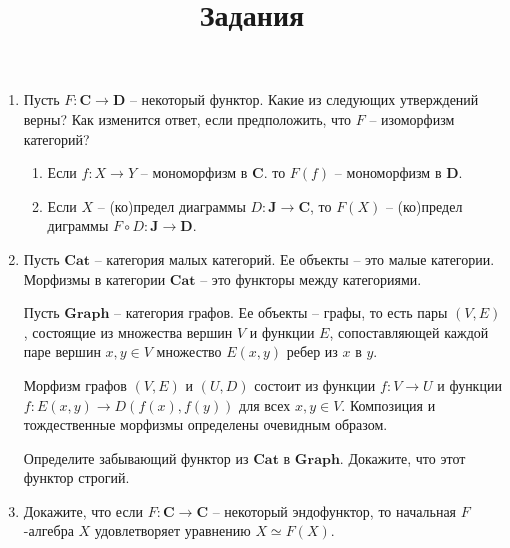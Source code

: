 \documentclass[draft]{article}
\newcommand{\cat}[1]{\mathbf{#1}}
\renewcommand{\C}{\cat{C}}
\newcommand{\D}{\cat{D}}
\begin{document}
\title{Задания}
\maketitle

\begin{enumerate}

\item Пусть $F : \C \to \D$ -- некоторый функтор.
Какие из следующих утверждений верны?
Как изменится ответ, если предположить, что $F$ -- изоморфизм категорий?
\begin{enumerate}
\item Если $f : X \to Y$ -- мономорфизм в $\C$. то $F(f)$ -- мономорфизм в $\D$.
\item Если $X$ -- (ко)предел диаграммы $D : \cat{J} \to \C$, то $F(X)$ -- (ко)предел диграммы $F \circ D : \cat{J} \to \D$.
\end{enumerate}

\item Пусть $\cat{Cat}$ -- категория малых категорий.
Ее объекты -- это малые категории.
Морфизмы в категории $\cat{Cat}$ -- это функторы между категориями.

Пусть $\cat{Graph}$ -- категория графов.
Ее объекты -- графы, то есть пары $(V,E)$, состоящие из множества вершин $V$ и функции $E$, сопоставляющей каждой паре вершин $x,y \in V$ множество $E(x,y)$ ребер из $x$ в $y$.

Морфизм графов $(V,E)$ и $(U,D)$ состоит из функции $f : V \to U$ и функции $f : E(x,y) \to D(f(x), f(y))$ для всех $x,y \in V$.
Композиция и тождественные морфизмы определены очевидным образом.

Определите забывающий функтор из $\cat{Cat}$ в $\cat{Graph}$.
Докажите, что этот функтор строгий.

\item Докажите, что если $F : \C \to \C$ -- некоторый эндофунктор, то начальная $F$-алгебра $X$ удовлетворяет уравнению $X \simeq F(X)$.

\end{enumerate}
\end{document}
